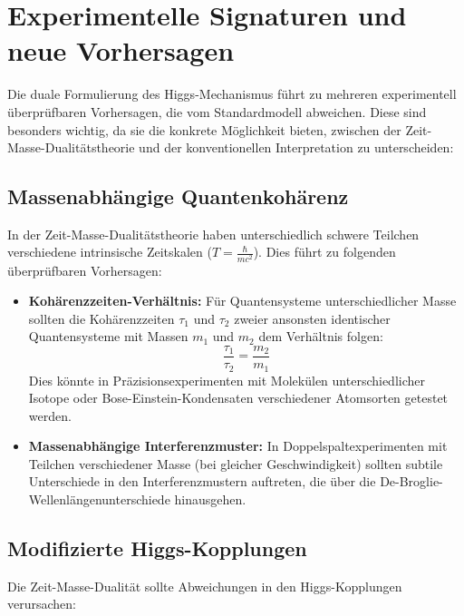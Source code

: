 \documentclass[a4paper,12pt]{article}
\begin{document}
	\section{Experimentelle Signaturen und neue Vorhersagen}
	
	Die duale Formulierung des Higgs-Mechanismus führt zu mehreren experimentell überprüfbaren Vorhersagen, die vom Standardmodell abweichen. Diese sind besonders wichtig, da sie die konkrete Möglichkeit bieten, zwischen der Zeit-Masse-Dualitätstheorie und der konventionellen Interpretation zu unterscheiden:
	
	\subsection{Massenabhängige Quantenkohärenz}
	
	In der Zeit-Masse-Dualitätstheorie haben unterschiedlich schwere Teilchen verschiedene intrinsische Zeitskalen ($T = \frac{\hbar}{mc^2}$). Dies führt zu folgenden überprüfbaren Vorhersagen:
	
	\begin{itemize}
		\item \textbf{Kohärenzzeiten-Verhältnis:} Für Quantensysteme unterschiedlicher Masse sollten die Kohärenzzeiten $\tau_1$ und $\tau_2$ zweier ansonsten identischer Quantensysteme mit Massen $m_1$ und $m_2$ dem Verhältnis folgen:
		\begin{equation}
			\frac{\tau_1}{\tau_2} = \frac{m_2}{m_1}
		\end{equation}
		Dies könnte in Präzisionsexperimenten mit Molekülen unterschiedlicher Isotope oder Bose-Einstein-Kondensaten verschiedener Atomsorten getestet werden.
		
		\item \textbf{Massenabhängige Interferenzmuster:} In Doppelspaltexperimenten mit Teilchen verschiedener Masse (bei gleicher Geschwindigkeit) sollten subtile Unterschiede in den Interferenzmustern auftreten, die über die De-Broglie-Wellenlängenunterschiede hinausgehen.
	\end{itemize}
	
	\subsection{Modifizierte Higgs-Kopplungen}
	
	Die Zeit-Masse-Dualität sollte Abweichungen in den Higgs-Kopplungen verursachen:
	
\end{document}
